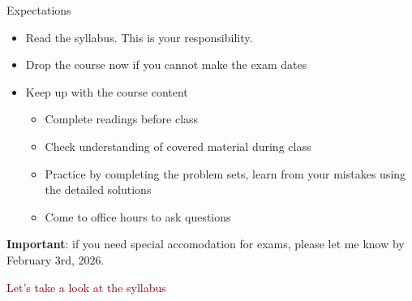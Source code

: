 \begin{frame}{Expectations}

    \begin{itemize}
        \item Read the syllabus. This is your responsibility.

        \item Drop the course now if you cannot make the exam dates

        \item Keep up with the course content
        \begin{itemize}
            \item Complete readings before class
            \item Check understanding of covered material during class
            \item Practice by completing the problem sets, learn from your mistakes using the detailed solutions
            \item Come to office hours to ask questions
        \end{itemize}
    \end{itemize}
    \vspace{3mm}

    \textbf{Important}: if you need special accomodation for exams, please let me know by February 3rd, 2026.
\end{frame}
\begin{frame}{}

    {\Large \textcolor{maroon}{Let's take a look at the syllabus}}
    
\end{frame}
